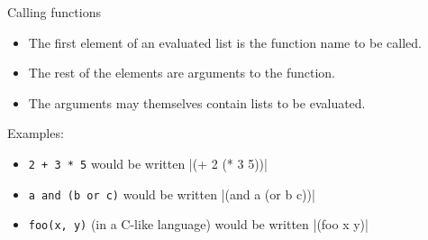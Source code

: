 \documentclass{beamer}
\begin{document}

\begin{frame}{Calling functions}
\begin{itemize}
\item The first element of an evaluated list is the function name to be called.
\item The rest of the elements are arguments to the function.
\item The arguments may themselves contain lists to be evaluated.
\end{itemize}
Examples:
\begin{itemize}
\item \texttt{2 + 3 * 5} would be written \cl|(+ 2 (* 3 5))|
\item \texttt{a and (b or c)} would be written \cl|(and a (or b c))|
\item \texttt{foo(x, y)} (in a C-like language) would be written \cl|(foo x y)|
\end{itemize}
\end{frame}
\end{document}
